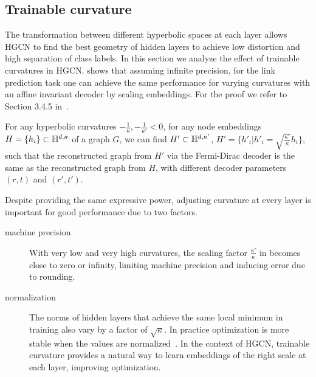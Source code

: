\subsection{Trainable curvature}
The transformation between different hyperbolic spaces at each layer allows HGCN to find the best geometry of hidden layers to achieve low distortion and high separation of class labels. In this section we analyze the effect of trainable curvatures in HGCN.  shows that assuming infinite precision, for the link prediction task one can achieve the same performance for varying curvatures with an affine invariant decoder by scaling embeddings. For the proof we refer to Section 3.4.5 in~\cite{Chami2021representationLearningAlgorithmsHyperbolicSpaces}.

\begin{theorem}\label{th:HGCNcurvature}
    For any hyperbolic curvatures $-\frac{1}{\kappa}, -\frac{1}{\kappa'} < 0$, for any node embeddings $H = \{h_i\} \subset \mathbb{H}^{d,\kappa}$ of a graph $G$, we can find $H' \subset \mathbb{H}^{d,\kappa'}$, $H' = \{h'_i | h'_i = \sqrt{\frac{\kappa'}{\kappa}}h_i\}$, such that the reconstructed graph from $H'$ via the Fermi-Dirac decoder is the same as the reconstructed graph from $H$, with different decoder parameters $(r, t)$ and $(r', t')$.    
\end{theorem}

Despite providing the same expressive power, adjusting curvature at every layer is important for good performance due to two factors.
\begin{description}
    \item[machine precision] With very low and very high curvatures, the scaling factor $\frac{\kappa'}{\kappa}$ in  becomes close to zero or infinity, limiting machine precision and inducing error due to rounding.
    \item[normalization] The norms of hidden layers that achieve the same local minimum in training also vary by a factor of $\sqrt{\kappa}$. In practice optimization is more stable when the values are normalized~\cite{ioffe2015batchNormalization}. In the context of HGCN, trainable curvature provides a natural way to learn embeddings of the right scale at each layer, improving optimization.
\end{description}